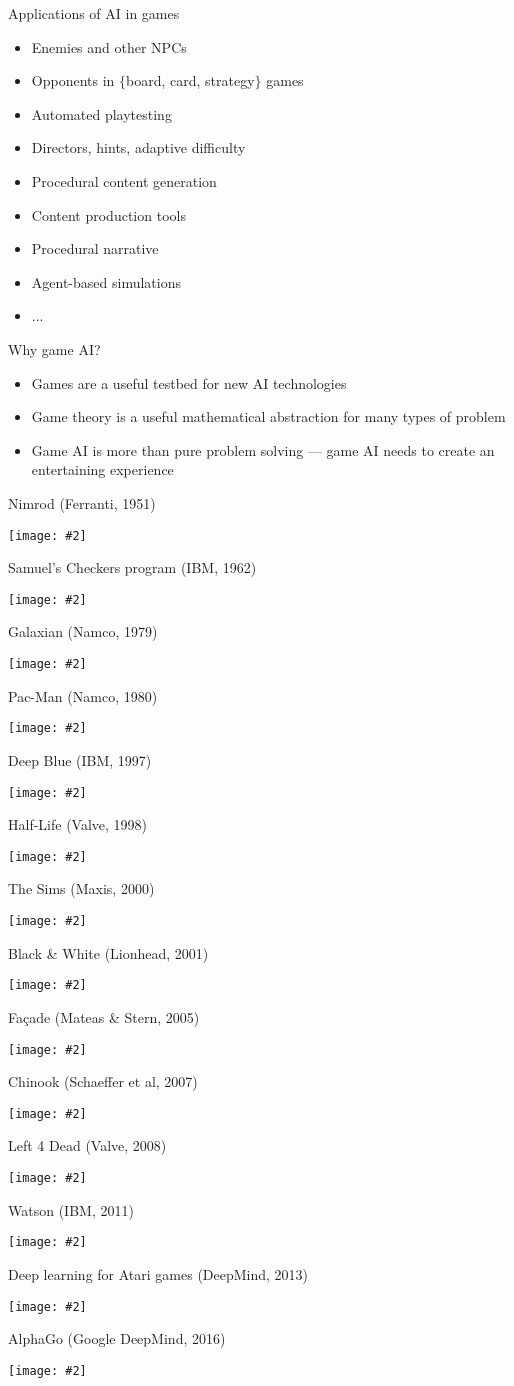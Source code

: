 \begin{frame}{Applications of AI in games}
	\begin{itemize}
		\pause\item Enemies and other NPCs
		\pause\item Opponents in $\{$board, card, strategy$\}$ games
		\pause\item Automated playtesting
		\pause\item Directors, hints, adaptive difficulty
		\pause\item Procedural content generation
		\pause\item Content production tools
		\pause\item Procedural narrative
		\pause\item Agent-based simulations
		\pause\item ...
	\end{itemize}
\end{frame}

\begin{frame}{Why game AI?}
	\begin{itemize}
		\pause\item Games are a useful testbed for new AI technologies
		\pause\item Game theory is a useful mathematical abstraction for many types of problem
		\pause\item Game AI is more than pure problem solving --- game AI needs to create an entertaining experience
	\end{itemize}
\end{frame}

\newcommand{\pictureslideb}[3]{
	\begin{frame}{#1}
		\begin{center}
			#3
			
			\vspace{6pt}
			
			\texttt{[image: \#2]}
		\end{center}
	\end{frame}
}

\newcommand{\pictureslide}[2]{
	\begin{frame}{#1}
		\begin{center}
			\texttt{[image: \#2]}
		\end{center}
	\end{frame}
}

\pictureslide{Nimrod (Ferranti, 1951)}{nimrod}
\pictureslide{Samuel's Checkers program (IBM, 1962)}{samuel}
\pictureslide{Galaxian (Namco, 1979)}{galaxian}
\pictureslide{Pac-Man (Namco, 1980)}{pacman}
\pictureslide{Deep Blue (IBM, 1997)}{deep_blue}
\pictureslide{Half-Life (Valve, 1998)}{half_life}
\pictureslide{The Sims (Maxis, 2000)}{sims}
\pictureslide{Black \& White (Lionhead, 2001)}{black_white}
\pictureslide{Fa\c{c}ade (Mateas \& Stern, 2005)}{facade}
\pictureslide{Chinook (Schaeffer et al, 2007)}{chinook}
\pictureslide{Left 4 Dead (Valve, 2008)}{left_4_dead}
\pictureslide{Watson (IBM, 2011)}{watson}
\pictureslide{Deep learning for Atari games (DeepMind, 2013)}{deepmind_atari}
\pictureslide{AlphaGo (Google DeepMind, 2016)}{alphago}
